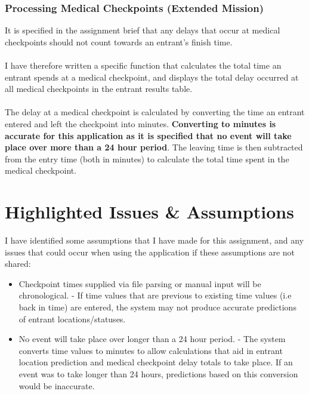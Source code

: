 \documentclass[12pt]{article}
\begin{document}
\subsubsection{Processing Medical Checkpoints (Extended Mission)}

It is specified in the assignment brief that any delays that occur at medical checkpoints should not count towards an entrant's finish time.\\\\
I have therefore written a specific function that calculates the total time an entrant spends at a medical checkpoint, and displays the total delay occurred at all medical checkpoints in the entrant results table. \\\\
The delay at a medical checkpoint is calculated by converting the time an entrant entered and left the checkpoint into minutes. \textbf{Converting to minutes is accurate for this application as it is specified that no event will take place over more than a 24 hour period}. The leaving time is then subtracted from the entry time (both in minutes) to calculate the total time spent in the medical checkpoint. 

\section{Highlighted Issues \& Assumptions}
I have identified some assumptions that I have made for this assignment, and any issues that could occur when using the application if these assumptions are not shared:

\begin{itemize}

\item Checkpoint times supplied via file parsing or manual input will be chronological. - If time values that are previous to existing time values (i.e back in time) are entered, the system may not produce accurate predictions of entrant locations/statuses.

\item No event will take place over longer than a 24 hour period. - The system converts time values to minutes to allow calculations that aid in entrant location prediction and medical checkpoint delay totals to take place. If an event was to take longer than 24 hours, predictions based on this conversion would be inaccurate.

\end{itemize}




\end{document}
